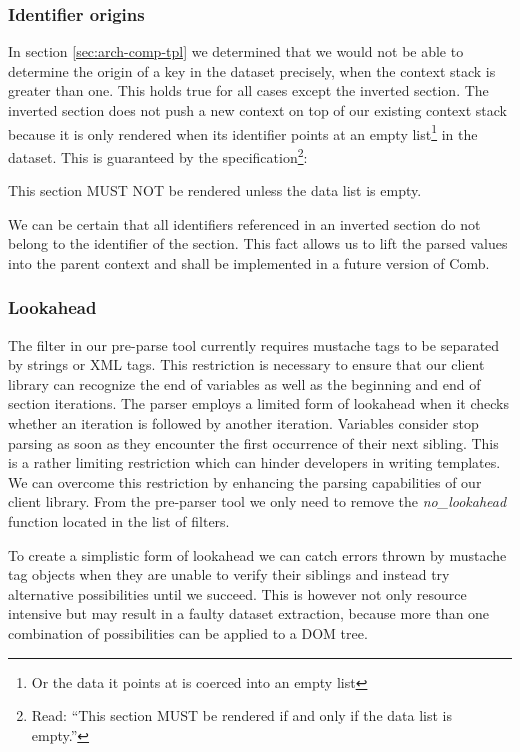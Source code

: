 \documentclass[thesis.tex]{subfiles}
\begin{document}
\subsubsection{Identifier origins}
In section \ref{sec:arch-comp-tpl} we determined that we would not be able to
determine the origin of a key in the dataset precisely, when the context
stack is greater than one. This holds true for all cases except the inverted
section. The inverted section does not push a new context on top of our existing
context stack because it is only rendered when its identifier points at an empty
list\footnote{Or the data it points at is coerced into an empty list} in the
dataset.
This is guaranteed by the specification\footnote{Read: ``This section MUST be
rendered if and only if the data list is empty.''}:
\begin{citequote}{\cite[inverted.yml]{MSTSPEC}}
This section MUST NOT be rendered unless the data list is empty.
\end{citequote}
We can be certain that all identifiers referenced in an inverted section do not
belong to the identifier of the section. This fact allows us to lift the parsed
values into the parent context and shall be implemented in a future version of
Comb.

\subsubsection{Lookahead}
\label{sec:lookahead}
The filter in our pre-parse tool currently requires mustache tags to be
separated by strings or XML tags. This restriction is necessary to ensure that
our client library can recognize the end of variables as well as the beginning
and end of section iterations. The parser employs a limited form of lookahead
when it checks whether an iteration is followed by another iteration. Variables
consider stop parsing as soon as they encounter the first occurrence of their
next sibling. This is a rather limiting restriction which can hinder developers
in writing templates.
We can overcome this restriction by enhancing the parsing capabilities of our
client library. From the pre-parser tool we only need to remove the
\emph{no\_lookahead} function located in the list of filters.

To create a simplistic form of lookahead we can catch errors thrown by
mustache tag objects when they are unable to verify their siblings and instead
try alternative possibilities until we succeed. This is however not only
resource intensive but may result in a faulty dataset extraction, because more
than one combination of possibilities can be applied to a DOM tree.
\end{document}
